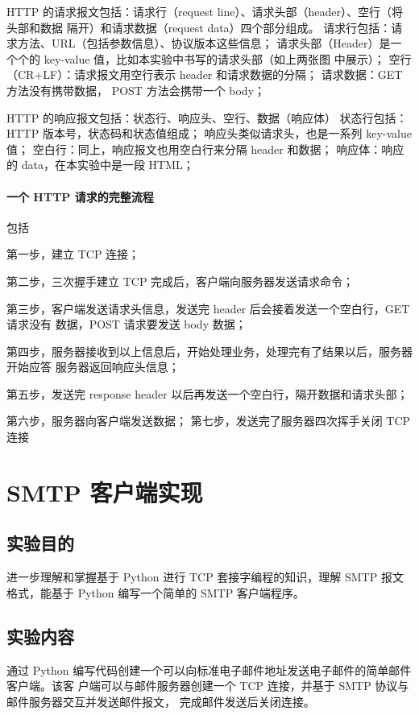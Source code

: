 \documentclass[a4paper,12pt]{report}
\begin{document}
\begin{spacing}{1.5}
HTTP 的请求报文包括：请求行（request line）、请求头部（header）、空行（将头部和数据 隔开）和请求数据（request data）四个部分组成。 请求行包括：请求方法、URL（包括参数信息）、协议版本这些信息； 请求头部（Header）是一个个的 key-value 值，比如本实验中书写的请求头部（如上两张图 中展示）； 空行（CR+LF）：请求报文用空行表示 header 和请求数据的分隔； 请求数据：GET 方法没有携带数据， POST 方法会携带一个 body；

HTTP 的响应报文包括：状态行、响应头、空行、数据（响应体） 状态行包括：HTTP 版本号，状态码和状态值组成； 响应头类似请求头，也是一系列 key-value 值； 空白行：同上，响应报文也用空白行来分隔 header 和数据； 响应体：响应的 data，在本实验中是一段 HTML；

\paragraph*{一个 HTTP 请求的完整流程}包括


第一步，建立 TCP 连接； 

第二步，三次握手建立 TCP 完成后，客户端向服务器发送请求命令； 

第三步，客户端发送请求头信息，发送完 header 后会接着发送一个空白行，GET 请求没有 数据，POST 请求要发送 body 数据； 

第四步，服务器接收到以上信息后，开始处理业务，处理完有了结果以后，服务器开始应答 服务器返回响应头信息； 

第五步，发送完 response header 以后再发送一个空白行，隔开数据和请求头部； 

第六步，服务器向客户端发送数据； 第七步，发送完了服务器四次挥手关闭 TCP 连接

\section{SMTP 客户端实现}

\subsection{实验目的}
进一步理解和掌握基于 Python 进行 TCP 套接字编程的知识，理解 SMTP 报文格式，能基于 Python 编写一个简单的 SMTP 客户端程序。

\subsection{实验内容}
通过 Python 编写代码创建一个可以向标准电子邮件地址发送电子邮件的简单邮件客户端。该客 户端可以与邮件服务器创建一个 TCP 连接，并基于 SMTP 协议与邮件服务器交互并发送邮件报文， 完成邮件发送后关闭连接。

\end{spacing}
\end{document}
